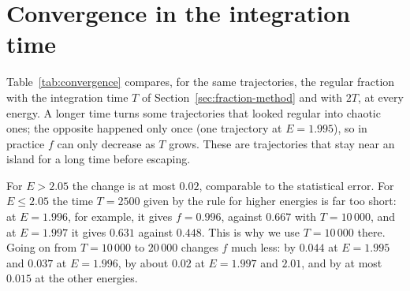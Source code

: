 \documentclass[11pt,a4paper]{article}
\begin{document}
\appendix

\section{Convergence in the integration time}\label{app:convergence}
Table~\ref{tab:convergence} compares, for the same trajectories, the regular
fraction with the integration time $T$ of Section~\ref{sec:fraction-method}
and with $2T$, at every
energy. A longer time turns some trajectories that looked regular into chaotic
ones; the opposite happened only once (one trajectory at $E=1.995$), so in
practice $f$ can only decrease as $T$ grows. These are trajectories that stay
near an island for a long time before escaping.

For $E>2.05$ the change is at most $0.02$, comparable to the statistical
error. For $E\le2.05$ the time $T=2500$ given by the rule for higher energies
is far too short: at $E=1.996$, for example, it gives $f=0.996$, against
$0.667$ with $T=10\,000$, and at $E=1.997$ it gives $0.631$ against $0.448$.
This is why we use $T=10\,000$ there. Going on from $T=10\,000$ to $20\,000$
changes $f$ much less: by $0.044$ at $E=1.995$ and $0.037$ at $E=1.996$, by
about $0.02$ at $E=1.997$ and $2.01$, and by at most $0.015$ at the other
energies.
\end{document}
